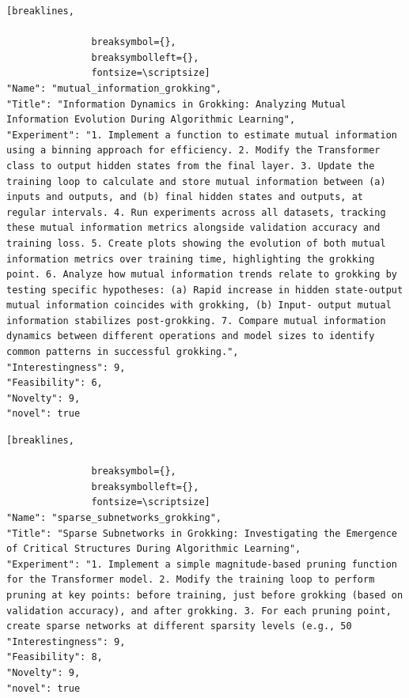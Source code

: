 \begin{tcolorbox}[
  breakable,
  colback  = blue!5!white,
  colframe = blue!75!black,
  title    = {Idea 15/50 - \texttt{mutual\_information\_grokking}},
  fontupper=\scriptsize\ttfamily,
]
\begin{Verbatim}[breaklines,

               breaksymbol={},
               breaksymbolleft={},
               fontsize=\scriptsize]
"Name": "mutual_information_grokking",
"Title": "Information Dynamics in Grokking: Analyzing Mutual Information Evolution During Algorithmic Learning",
"Experiment": "1. Implement a function to estimate mutual information using a binning approach for efficiency. 2. Modify the Transformer class to output hidden states from the final layer. 3. Update the training loop to calculate and store mutual information between (a) inputs and outputs, and (b) final hidden states and outputs, at regular intervals. 4. Run experiments across all datasets, tracking these mutual information metrics alongside validation accuracy and training loss. 5. Create plots showing the evolution of both mutual information metrics over training time, highlighting the grokking point. 6. Analyze how mutual information trends relate to grokking by testing specific hypotheses: (a) Rapid increase in hidden state-output mutual information coincides with grokking, (b) Input- output mutual information stabilizes post-grokking. 7. Compare mutual information dynamics between different operations and model sizes to identify common patterns in successful grokking.",
"Interestingness": 9,
"Feasibility": 6,
"Novelty": 9,
"novel": true
\end{Verbatim}
\end{tcolorbox}

\begin{tcolorbox}[
  breakable,
  colback  = blue!5!white,
  colframe = blue!75!black,
  title    = {Idea 16/50 - \texttt{sparse\_subnetworks\_grokking}},
  fontupper=\scriptsize\ttfamily,
]
\begin{Verbatim}[breaklines,

               breaksymbol={},
               breaksymbolleft={},
               fontsize=\scriptsize]
"Name": "sparse_subnetworks_grokking",
"Title": "Sparse Subnetworks in Grokking: Investigating the Emergence of Critical Structures During Algorithmic Learning",
"Experiment": "1. Implement a simple magnitude-based pruning function for the Transformer model. 2. Modify the training loop to perform pruning at key points: before training, just before grokking (based on validation accuracy), and after grokking. 3. For each pruning point, create sparse networks at different sparsity levels (e.g., 50
"Interestingness": 9,
"Feasibility": 8,
"Novelty": 9,
"novel": true
\end{Verbatim}
\end{tcolorbox}

